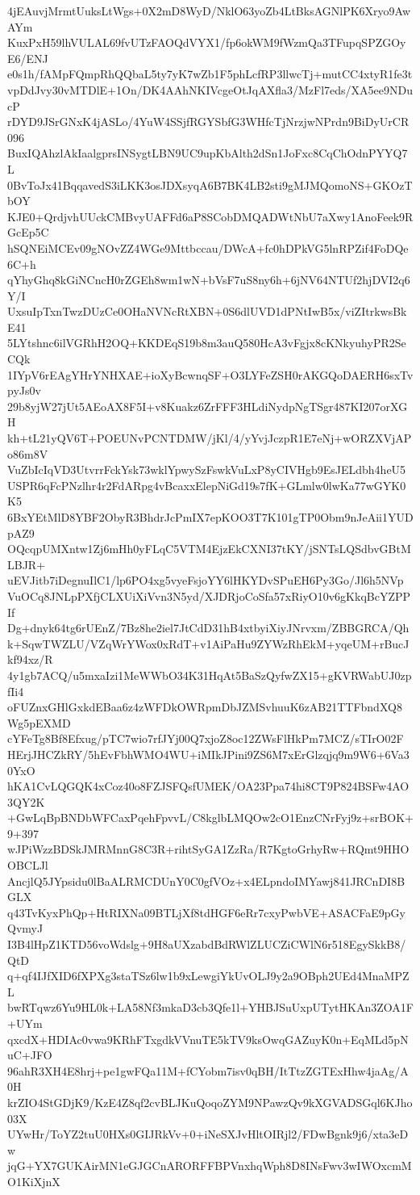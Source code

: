 4jEAuvjMrmtUuksLtWgs+0X2mD8WyD/NklO63yoZb4LtBksAGNlPK6Xryo9AwAYm
KuxPxH59lhVULAL69fvUTzFAOQdVYX1/fp6okWM9fWzmQa3TFupqSPZGOyE6/ENJ
e0s1h/fAMpFQmpRhQQbaL5ty7yK7wZb1F5phLcfRP3llwcTj+mutCC4xtyR1fe3t
vpDdJvy30vMTDlE+1On/DK4AAhNKIVcgeOtJqAXfla3/MzFl7eds/XA5ee9NDucP
rDYD9JSrGNxK4jASLo/4YuW4SSjfRGYSbfG3WHfcTjNrzjwNPrdn9BiDyUrCR096
BuxIQAhzlAkIaalgprsINSygtLBN9UC9upKbAlth2dSn1JoFxc8CqChOdnPYYQ7L
0BvToJx41BqqavedS3iLKK3osJDXsyqA6B7BK4LB2sti9gMJMQomoNS+GKOzTbOY
KJE0+QrdjvhUUckCMBvyUAFFd6aP8SCobDMQADWtNbU7aXwy1AnoFeek9RGcEp5C
hSQNEiMCEv09gNOvZZ4WGe9Mttbccau/DWcA+fc0hDPkVG5lnRPZif4FoDQe6C+h
qYhyGhq8kGiNCncH0rZGEh8wm1wN+bVsF7uS8ny6h+6jNV64NTUf2hjDVI2q6Y/I
UxsuIpTxnTwzDUzCe0OHaNVNcRtXBN+0S6dlUVD1dPNtIwB5x/viZItrkwsBkE41
5LYtshnc6ilVGRhH2OQ+KKDEqS19b8m3auQ580HcA3vFgjx8cKNkyuhyPR2SeCQk
1IYpV6rEAgYHrYNHXAE+ioXyBcwnqSF+O3LYFeZSH0rAKGQoDAERH6sxTvpyJs0v
29b8yjW27jUt5AEoAX8F5I+v8Kuakz6ZrFFF3HLdiNydpNgTSgr487KI207orXGH
kh+tL21yQV6T+POEUNvPCNTDMW/jKl/4/yYvjJczpR1E7eNj+wORZXVjAPo86m8V
VuZbIcIqVD3UtvrrFckYsk73wklYpwySzFswkVuLxP8yCIVHgb9EsJELdbh4heU5
USPR6qFcPNzlhr4r2FdARpg4vBcaxxElepNiGd19s7fK+GLmlw0lwKa77wGYK0K5
6BxYEtMlD8YBF2ObyR3BhdrJcPmIX7epKOO3T7K101gTP0Obm9nJeAii1YUDpAZ9
OQcqpUMXntw1Zj6mHh0yFLqC5VTM4EjzEkCXNI37tKY/jSNTsLQSdbvGBtMLBJR+
uEVJitb7iDegnuIlC1/lp6PO4xg5vyeFsjoYY6lHKYDvSPuEH6Py3Go/Jl6h5NVp
VuOCq8JNLpPXfjCLXUiXiVvn3N5yd/XJDRjoCoSfa57xRiyO10v6gKkqBcYZPPIf
Dg+dnyk64tg6rUEnZ/7Bz8he2iel7JtCdD31hB4xtbyiXiyJNrvxm/ZBBGRCA/Qh
k+SqwTWZLU/VZqWrYWox0xRdT+v1AiPaHu9ZYWzRhEkM+yqeUM+rBucJkf94xz/R
4y1gb7ACQ/u5mxaIzi1MeWWbO34K31HqAt5BaSzQyfwZX15+gKVRWabUJ0zpfIi4
oFUZnxGHlGxkdEBaa6z4zWFDkOWRpmDbJZMSvhuuK6zAB21TTFbndXQ8Wg5pEXMD
cYFeTg8Bf8Efxug/pTC7wio7rfJYj00Q7xjoZ8oc12ZWsFlHkPm7MCZ/sTIrO02F
HErjJHCZkRY/5hEvFbhWMO4WU+iMIkJPini9ZS6M7xErGlzqjq9m9W6+6Va30YxO
hKA1CvLQGQK4xCoz40o8FZJSFQsfUMEK/OA23Ppa74hi8CT9P824BSFw4AO3QY2K
+GwLqBpBNDbWFCaxPqehFpvvL/C8kglbLMQOw2cO1EnzCNrFyj9z+srBOK+9+397
wJPiWzzBDSkJMRMnnG8C3R+rihtSyGA1ZzRa/R7KgtoGrhyRw+RQmt9HHOOBCLJl
AncjlQ5JYpsidu0lBaALRMCDUnY0C0gfVOz+x4ELpndoIMYawj841JRCnDI8BGLX
q43TvKyxPhQp+HtRIXNa09BTLjXf8tdHGF6eRr7cxyPwbVE+ASACFaE9pGyQvmyJ
I3B4lHpZ1KTD56voWdslg+9H8aUXzabdBdRWlZLUCZiCWlN6r518EgySkkB8/QtD
q+qf4IJfXID6fXPXg3staTSz6lw1b9xLewgiYkUvOLJ9y2a9OBph2UEd4MnaMPZL
bwRTqwz6Yu9HL0k+LA58Nf3mkaD3cb3Qfe1l+YHBJSuUxpUTytHKAn3ZOA1F+UYm
qxcdX+HDIAc0vwa9KRhFTxgdkVVnuTE5kTV9ksOwqGAZuyK0n+EqMLd5pNuC+JFO
96ahR3XH4E8hrj+pe1gwFQa11M+fCYobm7isv0qBH/ItTtzZGTExHhw4jaAg/A0H
krZIO4StGDjK9/KzE4Z8qf2cvBLJKuQoqoZYM9NPawzQv9kXGVADSGql6KJho03X
UYwHr/ToYZ2tuU0HXs0GIJRkVv+0+iNeSXJvHltOIRjl2/FDwBgnk9j6/xta3eDw
jqG+YX7GUKAirMN1eGJGCnARORFFBPVnxhqWph8D8INsFwv3wIWOxcmMO1KiXjnX
